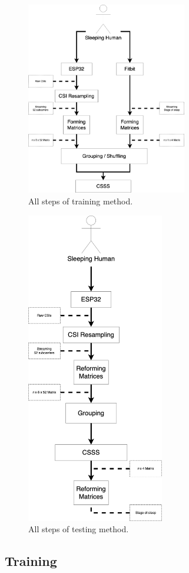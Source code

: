 \documentclass[10pt,letterpaper]{article}
\begin{document}
	
	\begin{figure}[htbp]
		\centerline{\includegraphics[width=70mm,scale=0.2]{TRAINSTEP08.png}}
		\caption{All steps of training method.}
		\label{fig:TRAINSTEP}
	\end{figure}
	\begin{figure}[htbp]
		\centerline{\includegraphics[width=60mm,scale=0.2]{TESTSTEP08.png}}
		\caption{All steps of testing method.}
		\label{fig:TESTSTEP}
	\end{figure}
	
	\subsection*{Training}
	
\end{document}

